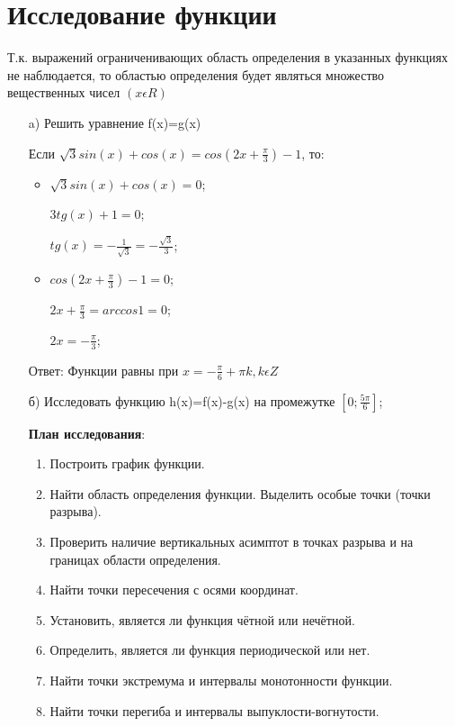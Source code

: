 \documentclass[russian,utf8,nocolumnxxxi,nocolumnxxxii]{eskdtext}
\begin{document}
\newpage
\section{Исследование функции}

Т.к. выражений ограниченивающих область определения в указанных функциях не наблюдается, то областью определения будет являться множество вещественных чисел $(x \epsilon R)$
\begin{enumerate}
    \item[a)]Решить уравнение f(x)=g(x)
    
   Если $\sqrt{3}sin(x)+cos(x)=cos(2x+\frac{\pi}{3})-1$,
   то:
   \begin{itemize}
   \renewcommand{\labelitemi}{$\bullet$}
       \item $\sqrt{3}sin(x)+cos(x)=0$;
       
       $3tg(x)+1=0$;
       
       $tg(x)=-\frac{1}{\sqrt{3}}=-\frac{\sqrt{3}}{3}$;
       
       \item $cos(2x+\frac{\pi}{3})-1=0$;
       
       $2x+\frac{\pi}{3}=arccos 1=0$;
       
       $2x=-\frac{\pi}{3}$;

   \end{itemize}
   
 Ответ: Функции равны при $x=-\frac{\pi}{6}+\pi k,  k \epsilon Z$
    
    \item[б)] Исследовать функцию h(x)=f(x)-g(x) на промежутке $[0;\frac{5\pi}{6}]$;
    
        \textbf{План исследования}:
    \begin{enumerate}
        \item Построить график функции.
        \item Найти область определения функции. Выделить особые точки (точки разрыва). 
        \item Проверить наличие вертикальных асимптот в точках разрыва и на границах области
определения.
        \item Найти точки пересечения с осями координат.
        \item Установить, является ли функция чётной или нечётной.
        \item Определить, является ли функция периодической или нет. 
        \item Найти точки экстремума и интервалы монотонности функции.
        \item Найти точки перегиба и интервалы выпуклости-вогнутости.
         

\end{enumerate}
\end{enumerate}
\end{document}
